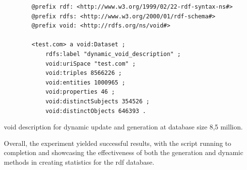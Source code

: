 \begin{listing}[htb!]
    \begin{verbatim}
        @prefix rdf: <http://www.w3.org/1999/02/22-rdf-syntax-ns#>
        @prefix rdfs: <http://www.w3.org/2000/01/rdf-schema#>
        @prefix void: <http://rdfs.org/ns/void#>
        
        <test.com> a void:Dataset ;
            rdfs:label "dynamic_void_description" ;
            void:uriSpace "test.com" ;
            void:triples 8566226 ;
            void:entities 1000965 ;
            void:properties 46 ;
            void:distinctSubjects 354526 ;
            void:distinctObjects 646393 .
    \end{verbatim}
    \caption{\gls{void} description for dynamic update and generation at database size 8,5 million.}
    \label{fig:void-description-result}
\end{listing}

Overall, the experiment yielded successful results, with the script running to completion and showcasing the effectiveness of both the generation and dynamic methods in creating statistics for the \gls{rdf} database.